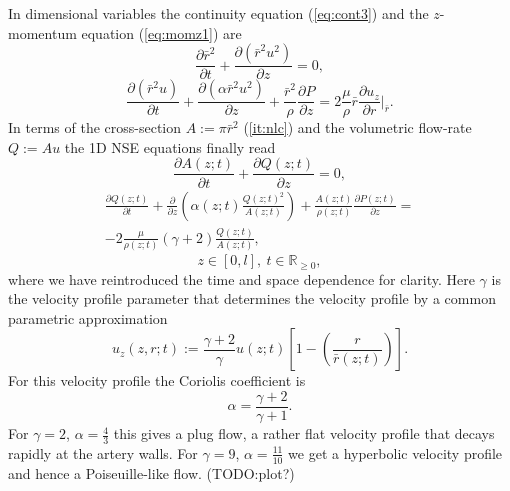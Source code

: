 \documentclass[a4paper, oneside]{discothesis}
\begin{document}
In dimensional variables the continuity equation (\autoref{eq:cont3}) and the $z$-momentum equation (\autoref{eq:momz1}) are
\begin{equation}
	\frac{\partial \bar{r}^2}{\partial t} + \frac{\partial (\bar{r}^2 u^2)}{\partial z} = 0,
\end{equation}
\begin{equation}
	\frac{\partial (\bar{r}^2 u)}{\partial t} + \frac{\partial (\alpha \bar{r}^2 u^2) }{\partial z} + \frac{\bar{r}^2}{\rho} \frac{\partial P}{\partial z} = 2 \frac{\mu}{\rho} \bar{r} \frac{\partial u_z}{\partial r} |_{\bar{r}}.
\end{equation}
In terms of the cross-section $A := \pi \bar{r}^2$ (\autoref{it:nlc}) and the volumetric flow-rate $Q := Au$ the 1D NSE equations finally read
\begin{equation}
		\frac{\partial A(z;t)}{\partial t} + \frac{\partial Q(z;t)}{\partial z} = 0, \label{eq:1deqs1}
\end{equation}
\begin{multline}
		\frac{\partial Q(z;t)}{\partial t} + \frac{\partial}{\partial z}\left(\alpha(z;t) \frac{Q(z;t)^2}{A(z;t)} \right) + \frac{A(z;t)}{\rho(z;t)} \frac{\partial P(z;t)}{\partial z} = \\
		-2 \frac{\mu}{\rho(z;t)} ( \gamma + 2 ) \frac{Q(z;t)}{A(z;t)}, \label{eq:1deqs2}
\end{multline}
\begin{equation}
		z \in [0,l],\  t \in \mathbb{R}_{\geq 0}, 
\end{equation}
where we have reintroduced the time and space dependence for clarity.
Here $\gamma$ is the velocity profile parameter that determines the velocity profile by a common parametric approximation 
\begin{equation}
	u_z(z,r;t) := \frac{\gamma + 2}{\gamma} u(z;t) \left[ 1 - \left( \frac{r}{\bar{r}(z;t)} \right) \right].
\end{equation}
For this velocity profile the Coriolis coefficient is
\begin{equation}
	\alpha = \frac{\gamma + 2}{\gamma + 1}.
\end{equation}
For $\gamma=2$, $\alpha = \frac{4}{3}$ this gives a plug flow, a rather flat velocity profile that decays rapidly at the artery walls.
For $\gamma=9$, $\alpha = \frac{11}{10} $ we get a hyperbolic velocity profile and hence a Poiseuille-like flow. (TODO:plot?)\cite{köppl2023dimension} \cite{barnard1966theory}
\end{document}
